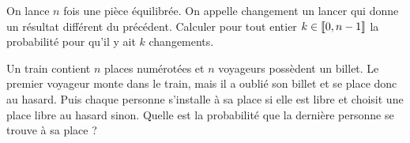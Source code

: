 \documentclass{magnolia}
\begin{document}
On lance $n$ fois une pièce équilibrée. On appelle changement un lancer qui donne un résultat différent du précédent.
Calculer pour tout entier $k \in \left\llbracket 0,n-1\right\rrbracket$ la probabilité pour qu'il y ait $k$ changements.



Un train contient $n$ places numérotées et $n$ voyageurs possèdent un billet. Le premier voyageur monte dans le train, mais il a oublié son billet et se place donc au hasard. Puis chaque personne s'installe à sa place si elle est libre et choisit une place libre au hasard sinon. Quelle est la probabilité que la dernière personne se trouve à sa place ?
\end{document}
